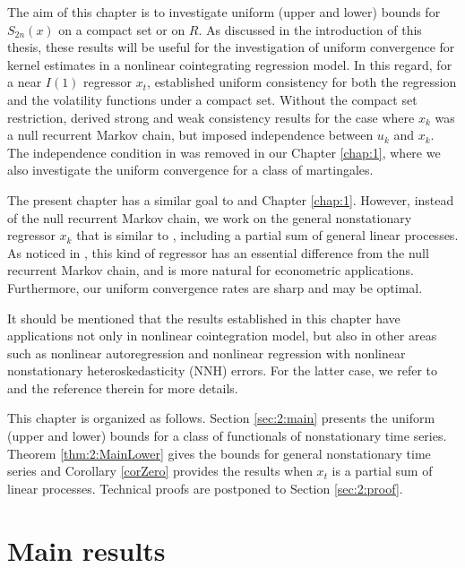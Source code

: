 The aim of this chapter is to investigate uniform (upper and lower) bounds  for $S_{2n}(x)$ on a compact set or on $R$. As discussed in the introduction of this thesis, these results will be useful for the investigation of uniform convergence for kernel estimates in a nonlinear cointegrating regression model. In this regard, for a near $I(1)$ regressor $x_t$, \cite{wangwang2012} established uniform consistency for  both the regression and the volatility functions under  a compact set. Without the compact set restriction,  \cite{gaolitjostheim2011} derived strong and weak consistency results for the case where $x_k$ was a null recurrent Markov chain,  but  imposed independence between $u_k$ and $x_k$. The independence condition in \cite{gaolitjostheim2011} was removed in our Chapter \ref{chap:1}, where we also investigate the uniform convergence for a class of martingales.

 The present chapter has a similar goal to \cite{gaolitjostheim2011} and Chapter \ref{chap:1}. However, instead of the null recurrent Markov chain, we work on the
  general nonstationary regressor $x_k$ that is similar to \cite{wangphillips2010a}, including a partial sum of general linear processes. As noticed in \cite{wangphillips2010a}, this kind of regressor has an essential difference from the null recurrent Markov chain, and is more natural for econometric applications. Furthermore, our uniform convergence rates are sharp and may be optimal.

 It should be mentioned that the results established in this chapter have applications not only in nonlinear cointegration model, but also in other areas such as nonlinear autoregression and  nonlinear regression with nonlinear nonstationary heteroskedasticity (NNH) errors. For the latter case, we refer to \cite{wangwang2012} and the reference therein for more details.

This chapter is organized as follows. Section \ref{sec:2:main} presents the uniform (upper and lower) bounds for a class of functionals  of nonstationary time series. Theorem \ref{thm:2:MainLower} gives the bounds for general nonstationary time series and Corollary \ref{corZero} provides the results when $x_t$ is a partial sum of linear processes. Technical proofs are postponed to Section \ref{sec:2:proof}.

\section{Main results} 

